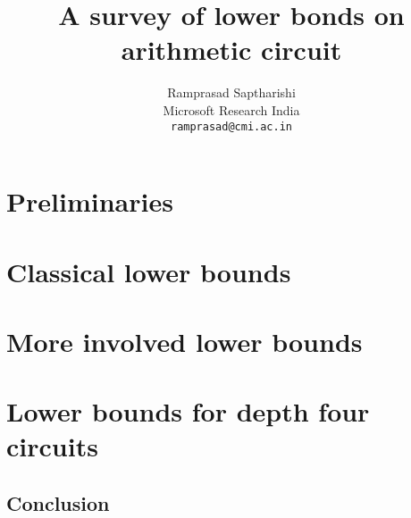 \documentclass[12pt]{report}
\begin{document}
\title{A survey of lower bonds on arithmetic circuit}
\author{Ramprasad Saptharishi\\Microsoft Research India\\
{\tt ramprasad@cmi.ac.in}}
\maketitle 

\begin{abstract}
\lipsum[1-2]
\end{abstract}

\tableofcontents

\part{Preliminaries}









\part{Classical lower bounds}





\part{More involved lower bounds}





\part{Lower bounds for depth four circuits}





\chapter{Conclusion}




\end{document}
